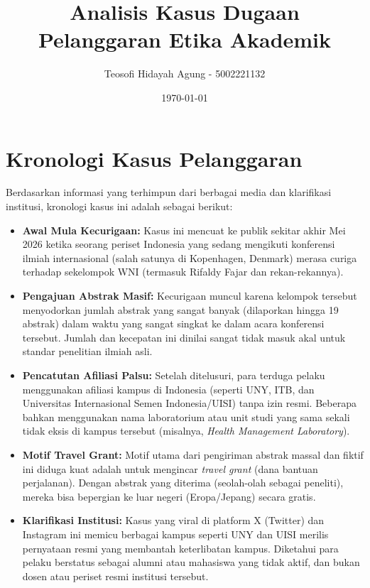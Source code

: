 \documentclass[12pt, a4paper]{article}
\begin{document}
\title{Analisis Kasus Dugaan Pelanggaran Etika Akademik}
\author{Teosofi Hidayah Agung - 5002221132}
\date{\today}
\maketitle

\section{Kronologi Kasus Pelanggaran}
Berdasarkan informasi yang terhimpun dari berbagai media dan klarifikasi institusi, kronologi kasus ini adalah sebagai berikut:
\begin{itemize}
  \item \textbf{Awal Mula Kecurigaan:} Kasus ini mencuat ke publik sekitar akhir Mei 2026 ketika seorang periset Indonesia yang sedang mengikuti konferensi ilmiah internasional (salah satunya di Kopenhagen, Denmark) merasa curiga terhadap sekelompok WNI (termasuk Rifaldy Fajar dan rekan-rekannya).
  \item \textbf{Pengajuan Abstrak Masif:} Kecurigaan muncul karena kelompok tersebut menyodorkan jumlah abstrak yang sangat banyak (dilaporkan hingga 19 abstrak) dalam waktu yang sangat singkat ke dalam acara konferensi tersebut. Jumlah dan kecepatan ini dinilai sangat tidak masuk akal untuk standar penelitian ilmiah asli.
  \item \textbf{Pencatutan Afiliasi Palsu:} Setelah ditelusuri, para terduga pelaku menggunakan afiliasi kampus di Indonesia (seperti UNY, ITB, dan Universitas Internasional Semen Indonesia/UISI) tanpa izin resmi. Beberapa bahkan menggunakan nama laboratorium atau unit studi yang sama sekali tidak eksis di kampus tersebut (misalnya, \textit{Health Management Laboratory}).
  \item \textbf{Motif Travel Grant:} Motif utama dari pengiriman abstrak massal dan fiktif ini diduga kuat adalah untuk mengincar \textit{travel grant} (dana bantuan perjalanan). Dengan abstrak yang diterima (seolah-olah sebagai peneliti), mereka bisa bepergian ke luar negeri (Eropa/Jepang) secara gratis.
  \item \textbf{Klarifikasi Institusi:} Kasus yang viral di platform X (Twitter) dan Instagram ini memicu berbagai kampus seperti UNY dan UISI merilis pernyataan resmi yang membantah keterlibatan kampus. Diketahui para pelaku berstatus sebagai alumni atau mahasiswa yang tidak aktif, dan bukan dosen atau periset resmi institusi tersebut.
\end{itemize}
\end{document}
